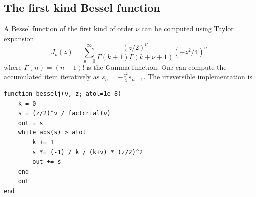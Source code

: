 \documentclass[aps,twocolumn,longbibliography,english,superscriptaddress]{revtex4-1}
\newcommand{\<}{\langle}
\renewcommand{\>}{\rangle}
\theoremstyle{definition}\newtheorem{definition}{\textit{Definition}}
\begin{document}
\subsection{The first kind Bessel function}\label{sec:bessel}
A Bessel function of the first kind of order $\nu$ can be computed using Taylor expansion
\begin{equation}
    J_\nu(z) = \sum\limits_{n=0}^{\infty} \frac{(z/2)^\nu}{\Gamma(k+1)\Gamma(k+\nu+1)} (-z^2/4)^{n}
\end{equation}
where $\Gamma(n) = (n-1)!$ is the Gamma function. One can compute the accumulated item iteratively as $s_n = -\frac{z^2}{4} s_{n-1}$. The irreversible implementation is

\begin{minipage}{.44\textwidth}
\begin{lstlisting}
function besselj(ν, z; atol=1e-8)
    k = 0
    s = (z/2)^ν / factorial(ν)
    out = s
    while abs(s) > atol
        k += 1
        s *= (-1) / k / (k+ν) * (z/2)^2
        out += s
    end
    out
end
\end{lstlisting}
\end{minipage}
\end{document}
